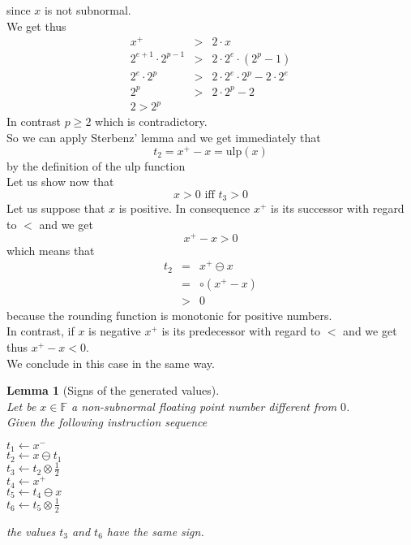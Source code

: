 \documentclass[a4paper,10pt,twoside]{article}
\newtheorem{lemma}[theorem]{Lemma}
\newenvironment{proof}[1][Proof]{\begin{trivlist}
\item[\hskip \labelsep {\bfseries #1}]}{\end{trivlist}}
\newcommand{\qed}{\nobreak \ifvmode \relax \else \ifdim \lastskip<1.5em \hskip-\lastskip
\hskip1.5em plus0em minus0.5em \fi \nobreak \vrule height0.75em width0.5em depth0.25em\fi}
\newcommand{\F}{\ensuremath{\mathbb {F}}}
\newcommand{\mUlp}{\ensuremath{\mathrm{ulp}}}
\begin{document}
\begin{proof}
since $x$ is not subnormal.\\
We get thus
\begin{eqnarray*}
x^+ & > & 2 \cdot x \\
2^{e+1} \cdot 2^{p-1} & > & 2 \cdot 2^e \cdot \left( 2^p - 1 \right) \\
2^e \cdot 2^p & > & 2 \cdot 2^e \cdot 2^p - 2 \cdot 2^e \\
2^p & > & 2 \cdot 2^p - 2 \\
2 > 2^p
\end{eqnarray*}
In contrast $p\geq2$ which is contradictory.\\
So we can apply Sterbenz' lemma \cite{Ste74} and we get immediately that
$$t_2 = x^+ - x = \mUlp \left( x \right)$$ by the definition of the $\mUlp$ function \\
Let us show now that
$$x > 0 \mbox{ iff } t_3 > 0$$
Let us suppose that $x$ is positive. In consequence $x^+$ is its successor with regard to $<$ and we get
$$x^+ - x > 0$$ which means that
\begin{eqnarray*}
t_2 & = & x^+ \ominus x \\
& = & \circ \left( x^+ - x \right) \\
& > & 0
\end{eqnarray*}
because the rounding function is monotonic for positive numbers.\\
In contrast, if $x$ is negative $x^+$ is its predecessor with regard to $<$ and we get thus $x^+ - x < 0$. \\
We conclude in this case in the same way.\qed
\end{proof}
\begin{lemma}[Signs of the generated values] \label{gensigne} ~\\
Let be $x \in \F$ a non-subnormal floating point number different from $0$.\\
Given the following instruction sequence
\begin{center}
$t_1 \gets x^-$ \\
$t_2 \gets x \ominus t_1$ \\
$t_3 \gets t_2 \otimes \frac{1}{2}$ \\
$t_4 \gets x^+$ \\
$t_5 \gets t_4 \ominus x$ \\
$t_6 \gets t_5 \otimes \frac{1}{2}$
\end{center}
the values $t_3$ and $t_6$ have the same sign.
\end{lemma}
\end{document}
